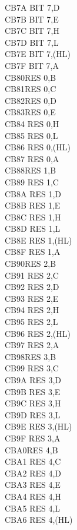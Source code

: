 \documentclass[twoside,openright,a4paper]{book}
\begin{document}
\begin{multicols}{3}
{\begin{tabbing}
	CB7A\> 	BIT 7,D\\
	CB7B\> 	BIT 7,E\\
	CB7C\> 	BIT 7,H\\
	CB7D\> 	BIT 7,L\\
	CB7E\> 	BIT 7,(HL)\\
	CB7F\> 	BIT 7,A\\
	CB80\>RES 0,B\\
	CB81\>RES 0,C\\
	CB82\>RES 0,D\\
	CB83\>RES 0,E\\
	CB84\> 	RES 0,H\\
	CB85\> 	RES 0,L\\
	CB86\> 	RES 0,(HL)\\
	CB87\> 	RES 0,A\\
	CB88\>RES 1,B\\
	CB89\> 	RES 1,C\\
	CB8A\> 	RES 1,D\\
	CB8B\> 	RES 1,E\\
	CB8C\> 	RES 1,H\\
	CB8D\> 	RES 1,L\\
	CB8E\> 	RES 1,(HL)\\
	CB8F\> 	RES 1,A\\
	CB90\>RES 2,B\\
	CB91\> 	RES 2,C\\
	CB92\> 	RES 2,D\\
	CB93\> 	RES 2,E\\
	CB94\> 	RES 2,H\\
	CB95\> 	RES 2,L\\
	CB96\> 	RES 2,(HL)\\
	CB97\> 	RES 2,A\\
	CB98\>RES 3,B\\
	CB99\> 	RES 3,C\\
	CB9A\> 	RES 3,D\\
	CB9B\> 	RES 3,E\\
	CB9C\> 	RES 3,H\\
	CB9D\> 	RES 3,L\\
	CB9E\> 	RES 3,(HL)\\
	CB9F\> 	RES 3,A\\
	CBA0\>RES 4,B\\
	CBA1\> 	RES 4,C\\
	CBA2\> 	RES 4,D\\
	CBA3\> 	RES 4,E\\
	CBA4\> 	RES 4,H\\
	CBA5\> 	RES 4,L\\
	CBA6\> 	RES 4,(HL)\\

\end{tabbing}}
\end{multicols}
\end{document}
